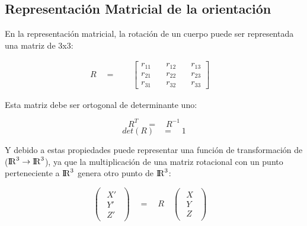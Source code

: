 \subsection{ Representación Matricial de la orientación }

En la representación matricial, la rotación de un cuerpo puede ser representada una matriz de 3x3:

\begin{equation}
\begin{matrix} R\quad =\quad \quad \begin{bmatrix} { r }_{ 11 } & { \quad r }_{ 12 } & { \quad r }_{ 13 } \\ { r }_{ 21 } & { \quad r }_{ 22 } & { \quad r }_{ 23 } \\ { r }_{ 31 } & { \quad r }_{ 32 } & { \quad r }_{ 33 } \end{bmatrix}\quad  \end{matrix}
\label{eq:MatrizRotacion}
\end{equation}

Esta matriz debe ser ortogonal de determinante uno:

\begin{equation}
{ R }^{ T }\quad =\quad { R }^{ -1 }
\label{eq:Propiedad1MatrizRotacion}
\end{equation}
\begin{equation}
det(R)\quad =\quad 1
\label{eq:Propiedad2MatrizRotacion}
\end{equation}


 Y  debido a estas propiedades  puede representar una función de transformación de (${\rm I\!R}^3 \to {\rm I\!R}^3$), ya que la multiplicación de una matriz rotacional con un punto perteneciente a ${\rm I\!R}^3$ genera otro punto de ${\rm I\!R}^3 $:
 
 \begin{equation}
 \begin{pmatrix} \begin{matrix} X' \\ Y' \\ Z' \end{matrix} \end{pmatrix}\quad =\quad R\quad \begin{pmatrix} \begin{matrix} X \\ Y \\ Z \end{matrix} \end{pmatrix}\quad 
 \label{eq:Propiedad3MatrizRotacion}
 \end{equation}
 

